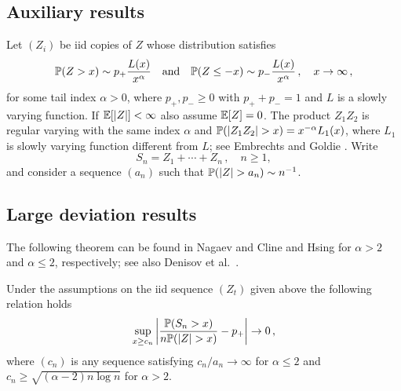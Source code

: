 \ifx\phdthesis\undefined
\appendix
\else
\begin{subappendices}
\fi


\section{Auxiliary results}\label{appendix:A}\setcounter{equation}{0}

Let $(Z_i)$ be iid copies of $Z$ whose distribution satisfies
\begin{equation*}
\mathbb{P}(Z>x)\sim p_+ \dfrac{L(x)}{x^{\alpha}}\quad\mbox{and}\quad  \mathbb{P}(Z\le -x)\sim p_-
\dfrac{L(x)}{x^{\alpha}} \,,\quad x \to \infty\,,
\end{equation*}
 for some tail index $\alpha>0$,
where $p_+,p_-\ge 0$ with $p_++p_-=1$ and $L$ is a slowly varying function. If $\mathbb{E}[|Z|]<\infty$ also assume $\mathbb{E}[Z]=0$. The product $Z_1Z_2$ is regular varying with the same index $\alpha$ and $\P(|Z_1Z_2|>x)= x^{-\alpha} L_1(x)$, where $L_1$ is slowly varying function different from $L$;
see Embrechts and Goldie \cite{embrechts:goldie:1980}.
Write
\begin{equation*}
S_n=Z_1+\cdots +Z_n\,,\quad n\ge 1,
\end{equation*} and consider a sequence $(a_n)$ such that $\P(|Z|>a_n)\sim n^{-1}$.

\subsection{Large deviation results}
The following theorem can be found in
Nagaev \cite{nagaev:1979} and Cline and Hsing
\cite{cline:hsing:1998} for $\alpha>2$ and $\alpha\le 2$,
respectively; see also  Denisov et al.~\cite{denisov:dieker:shneer:2008}.
\begin{theorem}\label{thm:nagaev}
Under the assumptions on the iid sequence $(Z_t)$
given above the following relation holds
\begin{equation*}
\sup_{x\ge c_n}\left|\dfrac{\P(S_n>x )}{n\P(|Z|>x)} -p_+ \right|\to 0\,,
\end{equation*}
where $(c_n)$ is any sequence satisfying $c_n/a_n\to  \infty$ for
$\alpha\le 2$ and $c_n\ge \sqrt{(\alpha-2)n\log n}$ for $\alpha>2$.
\end{theorem}





\end{subappendices}
